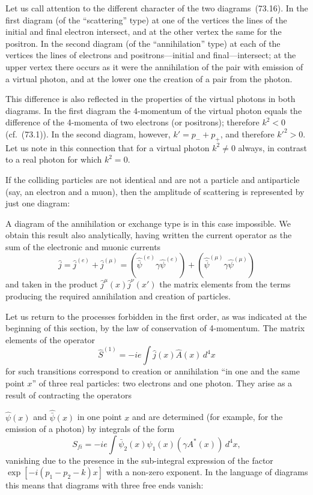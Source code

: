 Let us call attention to the different character of the two diagrams~(73.16). In the first diagram (of the ``scattering'' type) at one of the vertices the lines of the initial and final electron intersect, and at the other vertex the same for the positron. In the second diagram (of the ``annihilation'' type) at each of the vertices the lines of electrons and positrons---initial and final---intersect; at the upper vertex there occurs as it were the annihilation of the pair with emission of a virtual photon, and at the lower one the creation of a pair from the photon.

This difference is also reflected in the properties of the virtual photons in both diagrams. In the first diagram the 4-momentum of the virtual photon equals the difference of the 4-momenta of two electrons (or positrons); therefore $k^2 < 0$ (cf.~(73.1)). In the second diagram, however, $k' = p_- + p_+$, and therefore $k'^2 > 0$. Let us note in this connection that for a virtual photon $k^2 \neq 0$ always, in contrast to a real photon for which $k^2 = 0$.

If the colliding particles are not identical and are not a particle and antiparticle (say, an electron and a muon), then the amplitude of scattering is represented by just one diagram:

A diagram of the annihilation or exchange type is in this case impossible. We obtain this result also analytically, having written the current operator as the sum of the electronic and muonic currents
\[
\hat{j} = \hat{j}^{(e)} + \hat{j}^{(\mu)} = (\hat{\bar{\psi}}^{(e)}\gamma\hat{\psi}^{(e)}) + (\hat{\bar{\psi}}^{(\mu)}\gamma\hat{\psi}^{(\mu)})
\]
and taken in the product $\hat{j}^\mu(x)\hat{j}^\nu(x')$ the matrix elements from the terms producing the required annihilation and creation of particles.

Let us return to the processes forbidden in the first order, as was indicated at the beginning of this section, by the law of conservation of 4-momentum. The matrix elements of the operator
\begin{equation}
\hat{S}^{(1)} = -ie\int\hat{j}(x)\hat{A}(x)\,d^4x
\tag{73.18}
\end{equation}
for such transitions correspond to creation or annihilation ``in one and the same point $x$'' of three real particles: two electrons and one photon. They arise as a result of contracting the operators

$\hat{\psi}(x)$ and $\hat{\bar{\psi}}(x)$ in one point $x$ and are determined (for example, for the emission of a photon) by integrals of the form
\[
S_{fi} = -ie\int\bar{\psi}_2(x)\psi_1(x)(\gamma A^*(x))\,d^4x,
\]
vanishing due to the presence in the sub-integral expression of the factor $\exp[-i(p_1 - p_2 - k)x]$ with a non-zero exponent. In the language of diagrams this means that diagrams with three free ends vanish:

